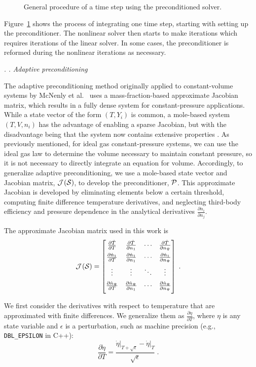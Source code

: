 \documentclass[twocolumn,10pt]{article}
\renewcommand{\subsection}%
              [1]%
              {%
               \bgroup%
               \flushleft%
               \small\em%
               \stepcounter{subsection}%
               \arabic{section}.%
               \arabic{subsection}. #1%
               \par%
               \egroup%
              }%
\newcommand{\sectionTwo}[1]{\subsection{#1} \addvspace{10pt}}
\begin{document}
\begin{figure}[htb]
    \centering
    \IntegrationOverview[0.85]{}
    \caption{General procedure of a time step using the preconditioned solver.}
    \label{f:integration_process}
\end{figure}

Figure~\ref{f:integration_process} shows the process of integrating one time step, starting with setting up the preconditioner.
The nonlinear solver then starts to make iterations which requires iterations of the linear solver.
In some cases, the preconditioner is reformed during the nonlinear iterations as necessary.

\sectionTwo{Adaptive preconditioning}
\label{sec:methods-adaptive}

The adaptive preconditioning method originally applied to constant-volume systems
by McNenly et al.~\cite{mcnenly_faster_2015} uses a mass-fraction-based approximate Jacobian matrix, which results in a fully dense system for constant-pressure applications.
While a state vector of the form $(T, Y_i)$ is common, a mole-based system $(T, V, n_i)$ has the advantage of enabling a sparse Jacobian, but with the disadvantage being that the system now contains extensive properties \cite{schwer_upgrading_2002}.
As previously mentioned, for ideal gas constant-pressure systems, we can use the ideal gas law to determine the volume necessary to maintain constant pressure, so it is not necessary to directly integrate an equation for volume.
Accordingly, to generalize adaptive preconditioning, we use a mole-based state vector and Jacobian matrix, $\mathcal{J}^{}(\mathcal{S}{})$, to develop the preconditioner, $\mathcal{P}$.
This approximate Jacobian is developed by eliminating elements below a certain threshold, computing finite difference temperature derivatives, and neglecting third-body efficiency and pressure dependence in the analytical derivatives $\frac{\partial \dot{n}_i}{\partial n_j}$.


The approximate Jacobian matrix used in this work is
\begin{equation}
    \J{\S{}} =
    \begin{bmatrix}
        \jacline{\dot{T}}
        \jacline{\dot{n}_{1}}
        \dotsline{}
        \jacline{\dot{n}_{\nspecies}}
    \end{bmatrix} \;.
\end{equation}

%
%
We first consider the derivatives with respect to temperature that are approximated with finite differences.
We generalize them as $\frac{\partial \dot{\eta}}{\partial T}$, where $\eta$ is any state variable and $\epsilon$ is a perturbation, such as machine precision (e.g., \texttt{DBL\_EPSILON} in C++):
\begin{equation}
    \label{eq:temp-dervs}
    \frac{\partial \dot{\eta}}{\partial T} = \frac{\dot{\eta}\big\vert_{T+\sqrt{\epsilon}}-\dot{\eta}\big\vert_{T}}{\sqrt{\epsilon}} \;.
\end{equation}
\end{document}
